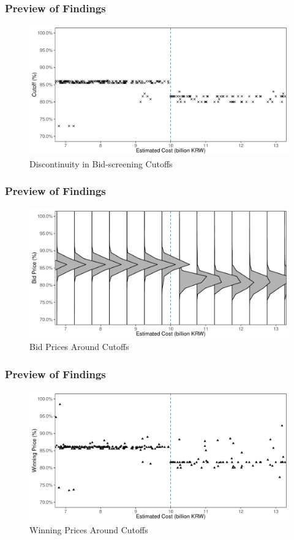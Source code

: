 \documentclass{beamer}
\begin{document}
\begin{frame}
\frametitle{Preview of Findings}
\begin{figure} \centering
\includegraphics[width = \linewidth]{../figure/limit.pdf}
\caption{Discontinuity in Bid-screening Cutoffs} \label{}
\end{figure}
\end{frame}

\begin{frame}
\frametitle{Preview of Findings}
\begin{figure} \centering
\includegraphics[width = \linewidth]{../figure/bid.pdf}
\caption{Bid Prices Around Cutoffs} \label{}
\end{figure}
\end{frame}

\begin{frame}
\frametitle{Preview of Findings}
\begin{figure} \centering
\includegraphics[width = \linewidth]{../figure/win.pdf}
\caption{Winning Prices Around Cutoffs} \label{}
\end{figure}
\end{frame}
\end{document}
